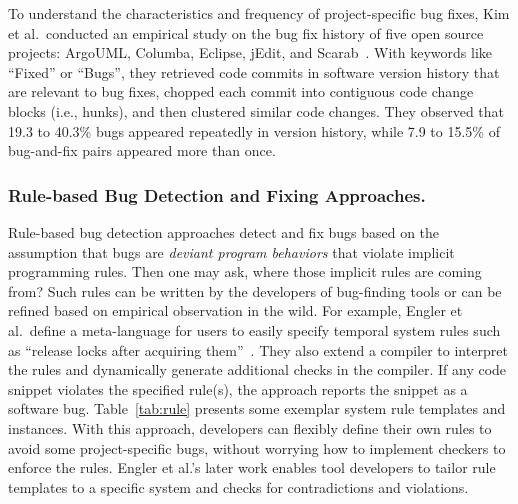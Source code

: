 To understand the characteristics and frequency of project-specific bug fixes, Kim et al.~conducted an empirical study on the bug fix history of five open source projects: ArgoUML, Columba, Eclipse, jEdit, and Scarab~\cite{Kim2006:MBF}. With keywords like ``Fixed'' or ``Bugs'', they retrieved code commits in software version history that are relevant to bug fixes, chopped each commit into contiguous code change blocks (i.e., hunks), and then clustered similar code changes. They observed that 19.3 to 40.3\% bugs appeared repeatedly in version history, while 7.9 to 15.5\% of bug-and-fix pairs appeared more than once.

\subsubsection{Rule-based Bug Detection and Fixing Approaches.}
Rule-based bug detection approaches detect and fix bugs based on the assumption that bugs are {\em deviant program behaviors} that violate implicit programming rules. Then one may ask, where those implicit rules are coming from? Such rules can be written by the developers of bug-finding tools or can be refined based on empirical observation in the wild. For example, Engler et al.~define a meta-language for users to easily specify temporal system rules such as ``release locks after acquiring them''~\cite{Engler2000:CSR}. They also extend a compiler to interpret the rules and dynamically generate additional checks in the compiler. If any code snippet violates the specified rule(s), the approach reports the snippet as a software bug. Table~\ref{tab:rule} presents some exemplar system rule templates and instances. With this approach, developers can flexibly define their own rules to avoid some project-specific bugs, without worrying how to implement checkers to enforce the rules. Engler et al.'s later work enables tool developers to tailor rule templates to a specific system and checks for contradictions and violations\cite{engler01bugs}.  

